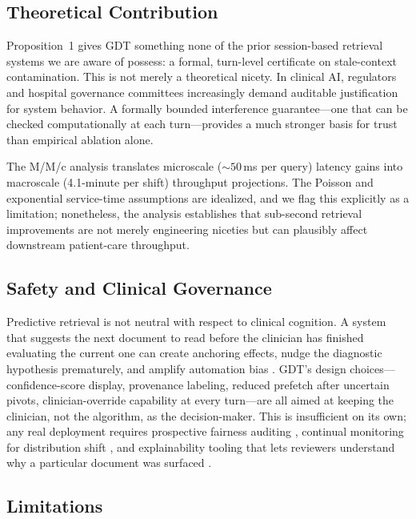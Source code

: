 \documentclass[review]{elsarticle}
\begin{document}
\subsection{Theoretical Contribution}

Proposition~1 gives GDT something none of the prior session-based retrieval
systems we are aware of possess: a formal, turn-level certificate on stale-context
contamination. This is not merely a theoretical nicety. In clinical AI, regulators
and hospital governance committees increasingly demand auditable justification for
system behavior. A formally bounded interference guarantee---one that can be
checked computationally at each turn---provides a much stronger basis for trust
than empirical ablation alone.

The M/M/c analysis translates microscale (${\sim}50\,$ms per query) latency gains
into macroscale (4.1-minute per shift) throughput projections. The Poisson and
exponential service-time assumptions are idealized, and we flag this explicitly as
a limitation; nonetheless, the analysis establishes that sub-second retrieval
improvements are not merely engineering niceties but can plausibly affect
downstream patient-care throughput.

\subsection{Safety and Clinical Governance}

Predictive retrieval is not neutral with respect to clinical cognition. A system
that suggests the next document to read before the clinician has finished
evaluating the current one can create anchoring effects, nudge the diagnostic
hypothesis prematurely, and amplify automation bias \cite{croskerry2003,goddard2012}.
GDT's design choices---confidence-score display, provenance labeling, reduced
prefetch after uncertain pivots, clinician-override capability at every turn---are
all aimed at keeping the clinician, not the algorithm, as the decision-maker. This
is insufficient on its own; any real deployment requires prospective fairness
auditing \cite{chen24}, continual monitoring for distribution shift
\cite{lee2020_continual}, and explainability tooling that lets reviewers understand
why a particular document was surfaced \cite{amann20,lekadir25,zhu2026_aicare}.

\subsection{Limitations}
\end{document}
